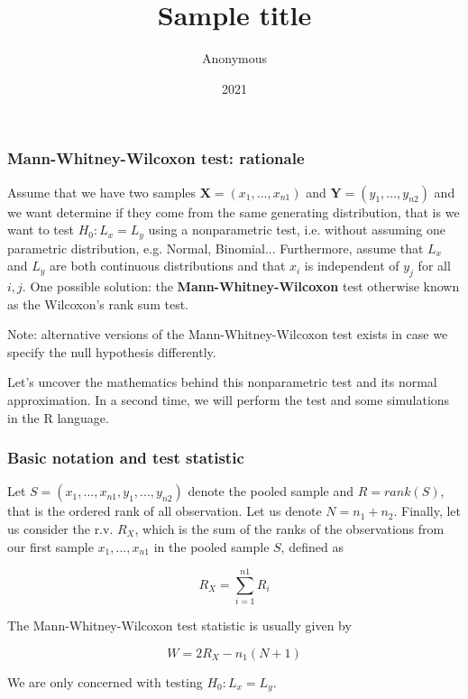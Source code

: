 \documentclass[border=5mm, convert, usenames, dvipsnames,beamer]{standalone}
\title{Sample title}
\author{Anonymous}
\institute{Overleaf}
\date{2021}
\begin{document}
\begin{frame}
\frametitle{Mann-Whitney-Wilcoxon test: rationale}

\vspace{30}
\noindent
Assume that we have two samples $\mathbf{X}= (x_{1},..., x_{n1})$ and $\mathbf{Y} = (y_{1},...,y_{n2})$ and we want determine if they come from the same generating distribution, that is we want to test $H_{0}:  L_{x} = L_{y}$ using a nonparametric test, i.e. without assuming one parametric distribution, e.g. Normal, Binomial... Furthermore, assume that $L_{x}$ and $L_{y}$ are both continuous distributions and that $x_{i}$ is independent of $y_{j}$ for all $i,j$. One possible solution: the \textbf{Mann-Whitney-Wilcoxon} test otherwise known as the Wilcoxon's rank sum test.

\vspace{5}
\noindent
Note: alternative versions of the Mann-Whitney-Wilcoxon test exists in case we specify the null hypothesis differently.


\vspace{5}
\noindent
Let's uncover the mathematics behind this nonparametric test and its normal approximation. In a second time, we will perform the test and some simulations in the R language.


\end{frame}




\begin{frame}
\frametitle{Basic notation and test statistic}

\vspace{40}
\noindent
Let $S=(x_{1},...,x_{n1},y_{1},...,y_{n2})$ denote the pooled sample and $R=rank(S)$, that is the ordered rank of all observation. Let us denote $N=n_{1}+n_{2}$. Finally, let us consider the r.v. $R_{X}$, which is the sum of the ranks of the observations from our first sample $x_{1},..., x_{n1}$ in the pooled sample $S$, defined as 

$$ R_{X}= \sum_{i=1}^{n1} R_{i}$$

\vspace{5}
\noindent
The Mann-Whitney-Wilcoxon test statistic is usually given by

$$
W = 2 R_{X} - n_{1} (N+1)
$$

\vspace{5}
\noindent
We are only concerned with testing $H_{0}:  L_{x} = L_{y}$.

\end{frame}
\end{document}
